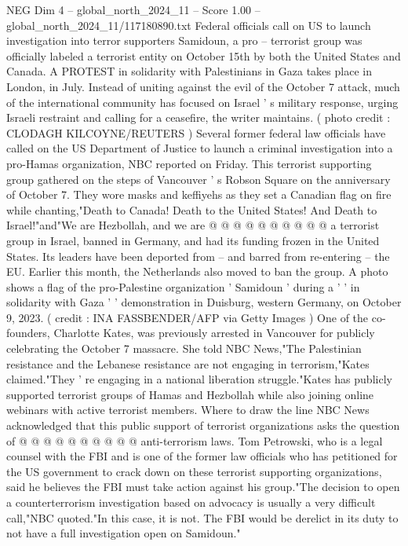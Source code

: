 \begin{textsample}{NEG Dim 4 – global\_north\_2024\_11 – Score 1.00 – global\_north\_2024\_11/117180890.txt}  \label{ex:f4_neg_178}
Federal officials call on US to launch investigation into terror supporters Samidoun, a pro -- terrorist group was officially labeled a terrorist entity on October 15th by both the United States and Canada.
A PROTEST in solidarity with Palestinians in Gaza takes place in London, in July.
Instead of uniting against the evil of the October 7 attack, much of the international community has focused on Israel ' s military response, urging Israeli restraint and calling for a ceasefire, the writer maintains. ( photo credit : CLODAGH KILCOYNE/REUTERS ) Several former federal law officials have called on the US Department of Justice to launch a criminal investigation into a pro-Hamas organization, NBC reported on Friday.
This terrorist supporting group gathered on the steps of Vancouver ' s Robson Square on the anniversary of October 7.
They wore masks and keffiyehs as they set a Canadian flag on fire while chanting,"Death to Canada!
Death to the United States!
And Death to Israel!"and"We are Hezbollah, and we are @ @ @ @ @ @ @ @ @ @ a terrorist group in Israel, banned in Germany, and had its funding frozen in the United States.
Its leaders have been deported from -- and barred from re-entering -- the EU.
Earlier this month, the Netherlands also moved to ban the group.
A photo shows a flag of the pro-Palestine organization ' Samidoun ' during a ' ' in solidarity with Gaza ' ' demonstration in Duisburg, western Germany, on October 9, 2023. ( credit : INA FASSBENDER/AFP via Getty Images ) One of the co-founders, Charlotte Kates, was previously arrested in Vancouver for publicly celebrating the October 7 massacre.
She told NBC News,"The Palestinian resistance and the Lebanese resistance are not engaging in terrorism,"Kates claimed."They ' re engaging in a national liberation struggle."Kates has publicly supported terrorist groups of Hamas and Hezbollah while also joining online webinars with active terrorist members.
Where to draw the line NBC News acknowledged that this public support of terrorist organizations asks the question of @ @ @ @ @ @ @ @ @ @ anti-terrorism laws.
Tom Petrowski, who is a legal counsel with the FBI and is one of the former law officials who has petitioned for the US government to crack down on these terrorist supporting organizations, said he believes the FBI must take action against his group."The decision to open a counterterrorism investigation based on advocacy is usually a very difficult call,"NBC quoted."In this case, it is not.
The FBI would be derelict in its duty to not have a full investigation open on Samidoun."

\end{textsample}
